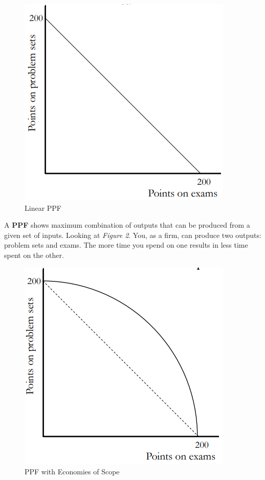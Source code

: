 \documentclass{article}
\begin{document}
\begin{figure}[H]
    \centering
    \includegraphics[scale=0.70]{"Figure 2a"}
    \caption{Linear PPF}
\end{figure}

A \textbf{PPF} shows maximum combination of outputs that can be produced from a
given set of inputs. Looking at \textit{Figure 2}. You, as a firm, can produce
two outputs: problem sets and exams. The more time you spend on one results in
less time spent on the other. 

\begin{figure}[H]
    \centering
    \includegraphics[scale=0.70]{"Figure 2b"}
    \caption{PPF with Economies of Scope}
\end{figure}
\end{document}
